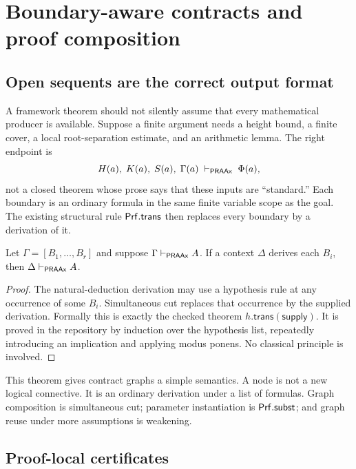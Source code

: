 \section{Boundary-aware contracts and proof composition}

\subsection{Open sequents are the correct output format}

A framework theorem should not silently assume that every mathematical
producer is available.  Suppose a finite argument needs a height bound, a
finite cover, a local root-separation estimate, and an arithmetic lemma.  The
right endpoint is
\[
  H(a),\;K(a),\;S(a),\;\Gamma(a)
  \;\vdash_{\mathsf{PRAAx}}\;\Phi(a),
\]
not a closed theorem whose prose says that these inputs are ``standard.''  Each
boundary is an ordinary formula in the same finite variable scope as the goal.
The existing structural rule \(\mathsf{Prf}.\mathsf{trans}\) then replaces every
boundary by a derivation of it.

\begin{theorem}
Let \(\Gamma=[B_1,\ldots,B_r]\) and suppose
\(\Gamma\vdash_{\mathsf{PRAAx}}A\).  If a context \(\Delta\) derives each
\(B_i\), then \(\Delta\vdash_{\mathsf{PRAAx}}A\).
\end{theorem}

\begin{proof}
The natural-deduction derivation may use a hypothesis rule at any occurrence of
some \(B_i\).  Simultaneous cut replaces that occurrence by the supplied
derivation.  Formally this is exactly the checked theorem
\(h.\mathsf{trans}(\mathsf{supply})\).  It is proved in the repository by
induction over the hypothesis list, repeatedly introducing an implication and
applying modus ponens.  No classical principle is involved.
\end{proof}

This theorem gives contract graphs a simple semantics.  A node is not a new
logical connective.  It is an ordinary derivation under a list of formulas.
Graph composition is simultaneous cut; parameter instantiation is
\(\mathsf{Prf}.\mathsf{subst}\); and graph reuse under more assumptions is weakening.

\subsection{Proof-local certificates}

